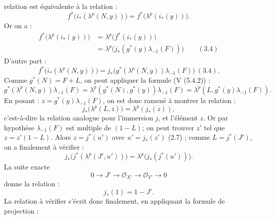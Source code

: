 relation est équivalente à la relation :
\[
  f^*\bigl(i_*(\lambda^p(N,y))\bigr)=
  f^*\bigl(\lambda^p(i_*(y))\bigr).
\]
Or on a :
\[
\begin{aligned}
 f^*\bigl(\lambda^p(i_*(y))\bigr)
 &=\lambda^p\bigl(f^*(i_*(y))\bigr)\\
 &=\lambda^p\bigl(j_*(g^*(y)\lambda_{-1}(F))\bigr)
\qquad(3.4)
\end{aligned}
\]
D'autre part :
\[
  f^*\bigl(i_*(\lambda^p(N,y))\bigr)
  =
  j_*\bigl(g^*(\lambda^p(N,y))\lambda_{-1}(F)\bigr)\ (3.4).
\]
Comme \(g^*(N)=F+L\), on peut appliquer la formule (V (5.4.2)) :
\[
  g^*(\lambda^p(N,y))\lambda_{-1}(F)
  =
  \lambda^p(g^*(N),g^*(y))\lambda_{-1}(F)
  =
  \lambda^p(L,g^*(y)\lambda_{-1}(F)).
\]
En posant : \(z=g^*(y)\lambda_{-1}(F)\), on est donc ramené à montrer la relation :
\[
  j_*\bigl(\lambda^p(L,z)\bigr)=\lambda^p(j_*(z)),
\]
c'est-à-dire la relation analogue pour l'immersion \(j\), et l'élément \(z\). Or par hypothèse \(\lambda_{-1}(F)\) est multiple de \((1-L)\); on peut trouver \(z'\) tel que \(z=z'(1-L)\). Alors \(z=j^*(u')\) avec \(u'=j_*(z')\) (2.7) ; comme \(L=j^*(J')\), on a finalement à vérifier :
\[
  j_*\bigl(j^*(\lambda^p(J',u'))\bigr)=
  \lambda^p\bigl(j_*(j^*(u'))\bigr).
\]
La suite exacte
\[
  0\longrightarrow J'\longrightarrow \mathcal O_{X'}
  \longrightarrow \mathcal O_{Y'}\longrightarrow 0
\]
donne la relation :
\begin{equation}\tag{4.3.2}
  j_*(1)=1-J'.
\end{equation}
La relation à vérifier s'écrit donc finalement, en appliquant la formule de
projection :

